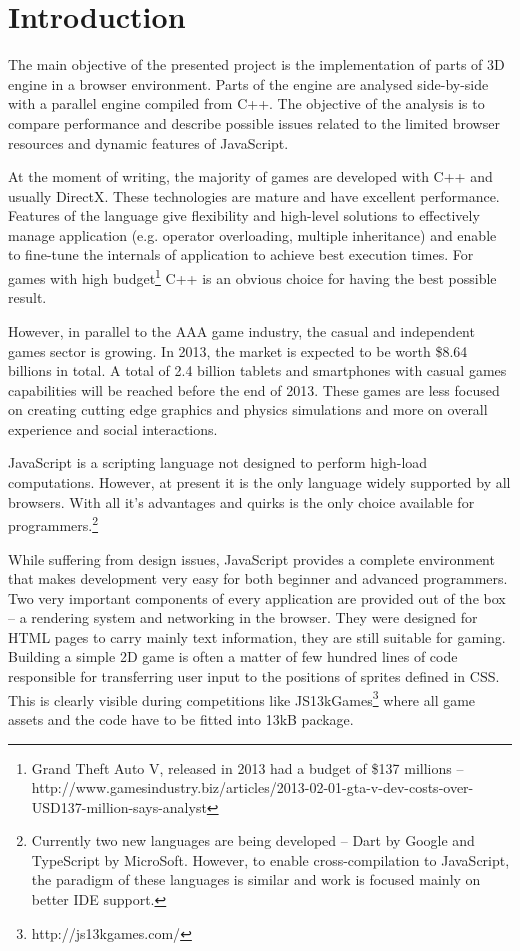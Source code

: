 \chapter{Introduction}
\label{cha:introduction}

The main objective of the presented project is the implementation of parts of 3D engine in a browser environment. Parts of the engine are analysed side-by-side with a parallel engine compiled from C++. The objective of the analysis is to compare performance and describe possible issues related to the limited browser resources and dynamic features of JavaScript.

At the moment of writing, the majority of games are developed with C++ and usually DirectX. These technologies are mature and have excellent performance. Features of the language give flexibility and high-level solutions to effectively manage application (e.g. operator overloading, multiple inheritance) and enable to fine-tune the internals of application to achieve best execution times. For games with high budget\footnote{Grand Theft Auto V, released in 2013 had a budget of \$137 millions -- http://www.gamesindustry.biz/articles/2013-02-01-gta-v-dev-costs-over-USD137-million-says-analyst} C++ is an obvious choice for having the best possible result.

However, in parallel to the AAA game industry, the casual and independent games sector is growing. In 2013, the market is expected to be worth \$8.64 billions in total. A total of 2.4 billion tablets and smartphones with casual games capabilities will be reached before the end of 2013. These games are less focused on creating cutting edge graphics and physics simulations and more on overall experience and social interactions.

JavaScript is a scripting language not designed to perform high-load computations. However, at present it is the only language widely supported by all browsers. With all it's advantages and quirks is the only choice available for programmers.\footnote{Currently two new languages are being developed -- Dart by Google and TypeScript by MicroSoft. However, to enable cross-compilation to JavaScript, the paradigm of these languages is similar and work is focused mainly on better IDE support.}

While suffering from design issues, JavaScript provides a complete environment that makes development very easy for both beginner and advanced programmers. Two very important components of every application are provided out of the box -- a rendering system and networking in the browser. They were designed for HTML pages to carry mainly text information, they are still suitable for gaming. Building a simple 2D game is often a matter of few hundred lines of code responsible for transferring user input to the positions of sprites defined in CSS. This is clearly visible during competitions like JS13kGames\footnote{http://js13kgames.com/} where all game assets and the code have to be fitted into 13kB package.

